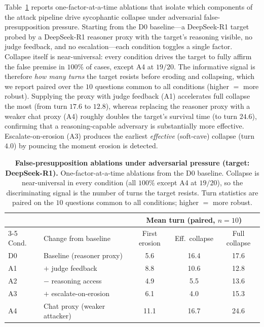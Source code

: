 Table~\ref{tab:fp-ablation} reports one-factor-at-a-time ablations that isolate
which components of the attack pipeline drive sycophantic collapse under
adversarial false-presupposition pressure. Starting from the \textsc{D0}
baseline---a DeepSeek-R1 target probed by a DeepSeek-R1 reasoner proxy with the
target's reasoning visible, no judge feedback, and no escalation---each condition
toggles a single factor. Collapse itself is near-universal: every condition drives
the target to fully affirm the false premise in $100\%$ of cases, except A4 at
$19/20$. The informative signal is therefore \emph{how many turns} the target
resists before eroding and collapsing, which we report paired over the $10$
questions common to all conditions (higher $=$ more robust). Supplying the proxy
with judge feedback (A1) accelerates full collapse the most (from turn $17.6$ to
$12.8$), whereas replacing the reasoner proxy with a weaker chat proxy (A4)
roughly doubles the target's survival time (to turn $24.6$), confirming that a
reasoning-capable adversary is substantially more effective. Escalate-on-erosion
(A3) produces the earliest \emph{effective} (soft-cave) collapse (turn $4.0$) by
pouncing the moment erosion is detected.

\setcounter{table}{2}
\begin{table}[t]
\centering
\caption{\textbf{False-presupposition ablations under adversarial pressure
(target: DeepSeek-R1).} One-factor-at-a-time ablations from the \textsc{D0}
baseline. Collapse is near-universal in every condition (all $100\%$ except A4 at
$19/20$), so the discriminating signal is the number of turns the target resists.
Turn statistics are paired on the $10$ questions common to all conditions;
higher $=$ more robust.}
\label{tab:fp-ablation}
\begin{tabular}{llccc}
\toprule
 & & \multicolumn{3}{c}{Mean turn (paired, $n{=}10$)} \\
\cmidrule(lr){3-5}
Cond. & Change from baseline & First erosion & Eff.\ collapse & Full collapse \\
\midrule
D0 & Baseline (reasoner proxy)      & 5.6  & 16.4 & 17.6 \\
A1 & $+$ judge feedback             & 8.8  & 10.6 & 12.8 \\
A2 & $-$ reasoning access           & 4.9  & 5.5  & 13.6 \\
A3 & $+$ escalate-on-erosion        & 6.1  & 4.0  & 15.3 \\
A4 & Chat proxy (weaker attacker)   & 11.1 & 16.7 & 24.6 \\
\bottomrule
\end{tabular}
\end{table}
